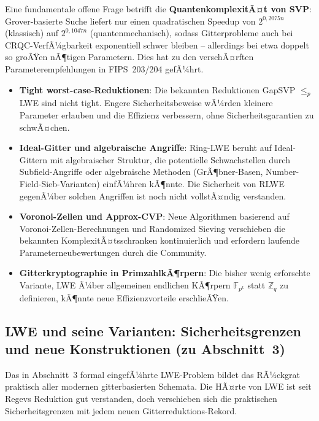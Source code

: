 ﻿\documentclass[a4paper,12pt]{article}
\theoremstyle{definition}
\begin{document}
Eine fundamentale offene Frage betrifft die \textbf{QuantenkomplexitÃ¤t
von SVP}: Grover-basierte Suche liefert nur einen quadratischen Speedup
von $2^{0{,}2075 n}$ (klassisch) auf $2^{0{,}1047n}$ (quantenmechanisch),
sodass Gitterprobleme auch bei CRQC-VerfÃ¼gbarkeit exponentiell schwer
bleiben -- allerdings bei etwa doppelt so groÃŸen nÃ¶tigen Parametern.
Dies hat zu den verschÃ¤rften Parameterempfehlungen in FIPS~203/204
gefÃ¼hrt.

\begin{itemize}
  \item \textbf{Tight worst-case-Reduktionen}: Die bekannten Reduktionen
    GapSVP $\leq_p$ LWE sind nicht tight. Engere Sicherheitsbeweise
    wÃ¼rden kleinere Parameter erlauben und die Effizienz verbessern,
    ohne Sicherheitsgarantien zu schwÃ¤chen.
  \item \textbf{Ideal-Gitter und algebraische Angriffe}: Ring-LWE beruht
    auf Ideal-Gittern mit algebraischer Struktur, die potentielle
    Schwachstellen durch Subfield-Angriffe oder algebraische Methoden
    (GrÃ¶bner-Basen, Number-Field-Sieb-Varianten) einfÃ¼hren kÃ¶nnte.
    Die Sicherheit von RLWE gegenÃ¼ber solchen Angriffen ist noch nicht
    vollstÃ¤ndig verstanden.
  \item \textbf{Voronoi-Zellen und Approx-CVP}: Neue Algorithmen
    basierend auf Voronoi-Zellen-Berechnungen und Randomized Sieving
    verschieben die bekannten KomplexitÃ¤tsschranken kontinuierlich
    und erfordern laufende Parameterneubewertungen durch die Community.
  \item \textbf{Gitterkryptographie in PrimzahlkÃ¶rpern}: Die bisher
    wenig erforschte Variante, LWE Ã¼ber allgemeinen endlichen KÃ¶rpern
    $\mathbb{F}_{p^k}$ statt $\mathbb{Z}_q$ zu definieren, kÃ¶nnte
    neue Effizienzvorteile erschlieÃŸen.
\end{itemize}

\subsection{LWE und seine Varianten: Sicherheitsgrenzen und neue Konstruktionen (zu Abschnitt~3)}

Das in Abschnitt~3 formal eingefÃ¼hrte LWE-Problem bildet das RÃ¼ckgrat
praktisch aller modernen gitterbasierten Schemata. Die HÃ¤rte von LWE
ist seit Regevs Reduktion \cite{Reg05} gut verstanden, doch verschieben
sich die praktischen Sicherheitsgrenzen mit jedem neuen
Gitterreduktions-Rekord.
\end{document}
